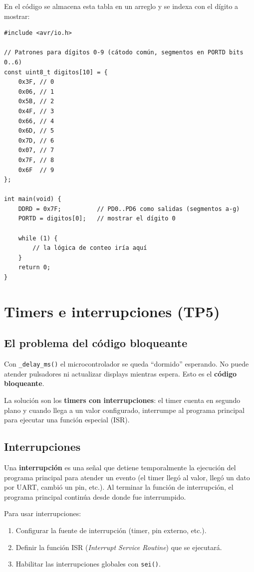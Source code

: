 En el código se almacena esta tabla en un arreglo y se indexa con el dígito a mostrar:

\begin{lstlisting}[style=estilo-c]
#include <avr/io.h>

// Patrones para dígitos 0-9 (cátodo común, segmentos en PORTD bits 0..6)
const uint8_t digitos[10] = {
    0x3F, // 0
    0x06, // 1
    0x5B, // 2
    0x4F, // 3
    0x66, // 4
    0x6D, // 5
    0x7D, // 6
    0x07, // 7
    0x7F, // 8
    0x6F  // 9
};

int main(void) {
    DDRD = 0x7F;          // PD0..PD6 como salidas (segmentos a-g)
    PORTD = digitos[0];   // mostrar el dígito 0

    while (1) {
        // la lógica de conteo iría aquí
    }
    return 0;
}
\end{lstlisting}

\section{Timers e interrupciones (TP5)}

\subsection{El problema del código bloqueante}

Con \texttt{\_delay\_ms()} el microcontrolador se queda ``dormido'' esperando. No
puede atender pulsadores ni actualizar displays mientras espera. Esto es el
\textbf{código bloqueante}.

La solución son los \textbf{timers con interrupciones}: el timer cuenta en segundo
plano y cuando llega a un valor configurado, interrumpe al programa principal para
ejecutar una función especial (ISR).

\subsection{Interrupciones}

Una \textbf{interrupción} es una señal que detiene temporalmente la ejecución del
programa principal para atender un evento (el timer llegó al valor, llegó un dato
por UART, cambió un pin, etc.). Al terminar la función de interrupción, el programa
principal continúa desde donde fue interrumpido.

Para usar interrupciones:

\begin{enumerate}
    \item Configurar la fuente de interrupción (timer, pin externo, etc.).
    \item Definir la función ISR (\textit{Interrupt Service Routine}) que se ejecutará.
    \item Habilitar las interrupciones globales con \texttt{sei()}.
\end{enumerate}

